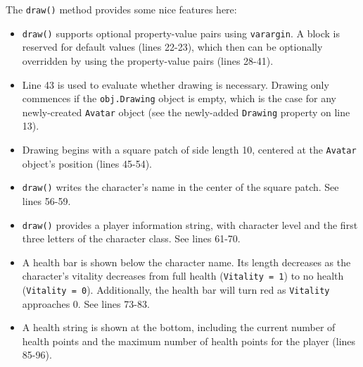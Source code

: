The \texttt{draw()} method provides some nice features here:
\begin{itemize}
\item \texttt{draw()} supports optional property-value pairs using \texttt{varargin}. A block is reserved for default values (lines 22-23), which then can be optionally overridden by using the property-value pairs (lines 28-41).
\item Line 43 is used to evaluate whether drawing is necessary. Drawing only commences if the \texttt{obj.Drawing} object is empty, which is the case for any newly-created \texttt{Avatar} object (see the newly-added \texttt{Drawing} property on line 13).
\item Drawing begins with a square patch of side length 10, centered at the \texttt{Avatar} object's position (lines 45-54).
\item \texttt{draw()} writes the character's name in the center of the square patch. See lines 56-59.
\item \texttt{draw()} provides a player information string, with character level and the first three letters of the character class. See lines 61-70.
\item A health bar is shown below the character name. Its length decreases as the character's vitality decreases from full health (\texttt{Vitality = 1}) to no health (\texttt{Vitality = 0}). Additionally, the health bar will turn red as \texttt{Vitality} approaches 0. See lines 73-83.
\item A health string is shown at the bottom, including the current number of health points and the maximum number of health points for the player (lines 85-96).
\end{itemize}

